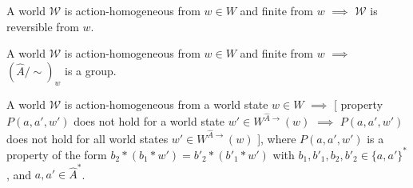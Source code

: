 \begin{propositionE}
    A world $\mathscr{W}$ is action-homogeneous from $w \in W$ and finite from $w$ $\implies$ $\mathscr{W}$ is reversible from $w$.
\end{propositionE}
\begin{proofE}
\end{proofE}

\begin{corollary}
    A world $\mathscr{W}$ is action-homogeneous from $w \in W$ and finite from $w$ $\implies$ $(\hat{A}/\sim)_{w}$ is a group.
\end{corollary}


\begin{propositionE}
    A world $\mathscr{W}$ is action-homogeneous from a world state $w \in W$ $\implies$ [ property $P(a, a', w')$ does not hold for a world state $w' \in W^{\hat{A}\to}(w)$ $\implies$ $P(a, a', w')$ does not hold for all world states $w' \in W^{\hat{A}\to}(w)$ ], where $P(a, a', w')$ is a property of the form $b_{2} \ast (b_{1} \ast w') = b'_{2} \ast (b'_{1} \ast w')$ with $b_{1}, b'_{1}, b_{2}, b'_{2} \in \{a, a'\}^{*}$, and $a, a' \in \hat{A}^{*}$.
\end{propositionE}
